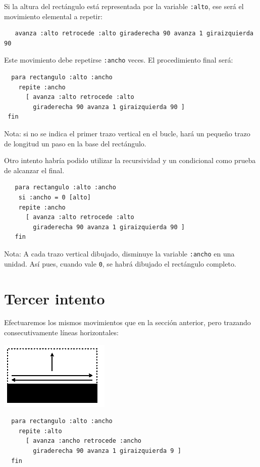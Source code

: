 \documentclass[12pt,twoside,spanish,a4paper]{report}
\begin{document}
Si la altura del rect\'angulo est\'a representada por la variable \texttt{:alto},
ese ser\'a el movimiento elemental a repetir:
\begin{verbatim}
   avanza :alto retrocede :alto giraderecha 90 avanza 1 giraizquierda 90 \end{verbatim}
Este movimiento debe repetirse \texttt{:ancho} veces. El procedimiento
final ser\'a:
\begin{verbatim}
  para rectangulo :alto :ancho
    repite :ancho
      [ avanza :alto retrocede :alto
        giraderecha 90 avanza 1 giraizquierda 90 ]
 fin \end{verbatim}
Nota: si no se indica el primer trazo vertical en el bucle, har\'a un
peque\~no trazo de longitud un paso en la base del rect\'angulo.

Otro intento habr\'ia podido utilizar la recursividad y un condicional
como prueba de alcanzar el final.
\begin{verbatim}
   para rectangulo :alto :ancho
    si :ancho = 0 [alto]
    repite :ancho
      [ avanza :alto retrocede :alto
        giraderecha 90 avanza 1 giraizquierda 90 ]
   fin \end{verbatim}

Nota: A cada trazo vertical dibujado, disminuye la variable \texttt{:ancho}
en una unidad. As\'i pues, cuando vale \texttt{0}, se habr\'a dibujado el
rect\'angulo completo.

\section{Tercer intento}
   \label{sub:Tercer-intento}

% 
Efectuaremos los mismos movimientos que en la secci\'on anterior, pero
trazando consecutivamente l\'ineas horizontales:
\noindent \begin{center}
   \includegraphics[scale=0.75]{Imagenes_Tutorial/12_Recursividad_3}
\end{center}
\begin{verbatim}
  para rectangulo :alto :ancho
    repite :alto
      [ avanza :ancho retrocede :ancho
        giraderecha 90 avanza 1 giraizquierda 9 ]
  fin \end{verbatim}
\end{document}
